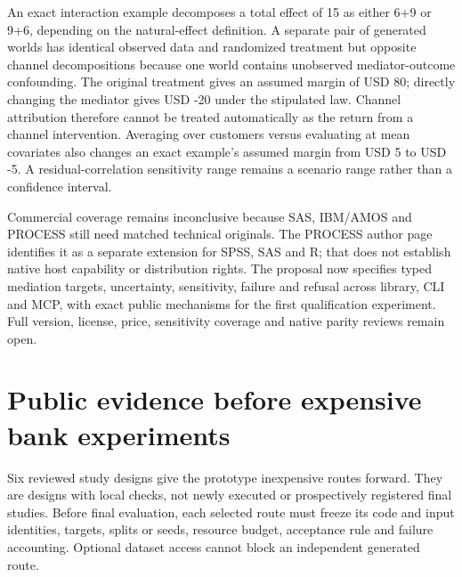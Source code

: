 An exact interaction example decomposes a total effect of 15 as either
6+9 or 9+6, depending on the natural-effect definition. A separate pair
of generated worlds has identical observed data and randomized treatment
but opposite channel decompositions because one world contains
unobserved mediator-outcome confounding. The original treatment gives an
assumed margin of USD 80; directly changing the mediator gives USD -20
under the stipulated law. Channel attribution therefore cannot be
treated automatically as the return from a channel intervention.
Averaging over customers versus evaluating at mean covariates also
changes an exact example's assumed margin from USD 5 to USD -5. A
residual-correlation sensitivity range remains a scenario range rather
than a confidence interval.\citep{exec20_med_reference}

Commercial coverage remains inconclusive because SAS, IBM/AMOS and
PROCESS still need matched technical originals. The PROCESS author page
identifies it as a separate extension for SPSS, SAS and R; that does not
establish native host capability or distribution rights. The proposal
now specifies typed mediation targets, uncertainty, sensitivity, failure
and refusal across library, CLI and MCP, with exact public mechanisms
for the first qualification experiment. Full version, license, price,
sensitivity coverage and native parity reviews remain
open.\citep{exec20_med_process_lead}

\hypertarget{public-evidence-before-expensive-bank-experiments}{%
\section{Public evidence before expensive bank
experiments}\label{public-evidence-before-expensive-bank-experiments}}

Six reviewed study designs give the prototype inexpensive routes
forward. They are designs with local checks, not newly executed or
prospectively registered final studies. Before final evaluation, each
selected route must freeze its code and input identities, targets,
splits or seeds, resource budget, acceptance rule and failure
accounting. Optional dataset access cannot block an independent
generated route. \citep{sp13_public}


